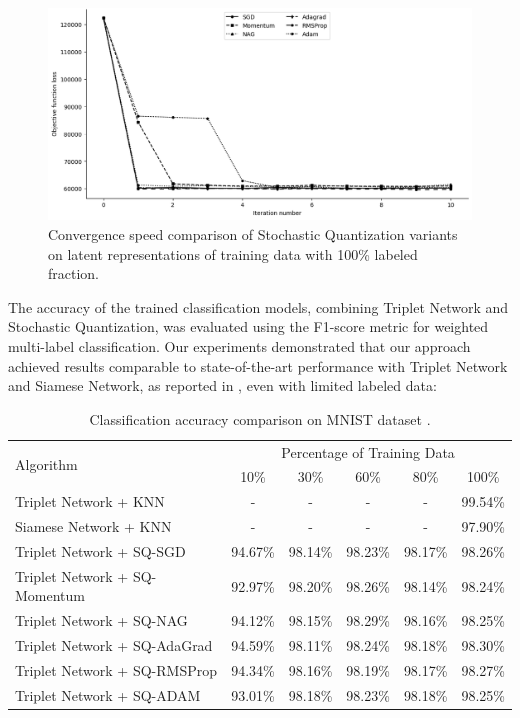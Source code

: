 \begin{figure}
    \centering
    \includegraphics[width=\textwidth]{figures/sq_convergence_full_dataset.png}
    \caption{Convergence speed comparison of Stochastic Quantization variants on latent representations of training data with 100\% labeled fraction.}
    \label{convergence:fig}
\end{figure}

The accuracy of the trained classification models, combining Triplet Network and Stochastic Quantization, was evaluated using the F1-score metric \cite{Chinchor_1992} for weighted multi-label classification. Our experiments demonstrated that our approach achieved results comparable to state-of-the-art performance with Triplet Network and Siamese Network, as reported in \cite{Hoffer_2015}, even with limited labeled data:

\begin{table}
\caption{Classification accuracy comparison on MNIST dataset \cite{lecun2010mnist}.}
\label{accuracy:table}
    \begin{tabularx}{\textwidth}{|X|*{5}{c|}}
        \hline
        \multirow{2}{*}{Algorithm} & \multicolumn{5}{c|}{Percentage of Training Data} \\
        \cline{2-6}
        & 10\% & 30\% & 60\% & 80\% & 100\% \\
        \hline
        Triplet Network + KNN         & - & - & - & - & 99.54\% \\
        Siamese Network + KNN         & - & - & - & - & 97.90\% \\
        Triplet Network + SQ-SGD      & 94.67\% & 98.14\% & 98.23\% & 98.17\% & 98.26\% \\
        Triplet Network + SQ-Momentum & 92.97\% & 98.20\% & 98.26\% & 98.14\% & 98.24\% \\
        Triplet Network + SQ-NAG      & 94.12\% & 98.15\% & 98.29\% & 98.16\% & 98.25\% \\
        Triplet Network + SQ-AdaGrad  & 94.59\% & 98.11\% & 98.24\% & 98.18\% & 98.30\% \\
        Triplet Network + SQ-RMSProp  & 94.34\% & 98.16\% & 98.19\% & 98.17\% & 98.27\% \\
        Triplet Network + SQ-ADAM     & 93.01\% & 98.18\% & 98.23\% & 98.18\% & 98.25\% \\
        \hline
    \end{tabularx}
\end{table}